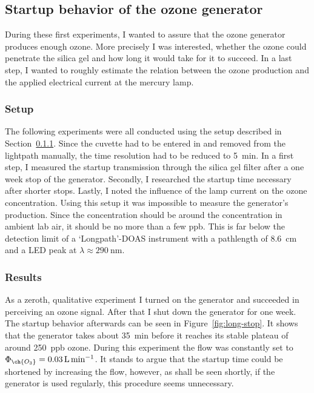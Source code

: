 \subsection{Startup behavior of the ozone generator}
\label{sec:ozone}

During these first experiments, I wanted to assure that the ozone
generator produces enough ozone. More precisely I was interested,
whether the ozone could penetrate the silica gel and how long it would
take for it to succeed. In a last step, I wanted to roughly estimate
the relation between the ozone production and the applied electrical
current at the mercury lamp.

\subsubsection{Setup}
\label{sec:ozone-setup}

The following experiments were all conducted using the setup described
in Section~\ref{sec:ozone-setup}. Since the cuvette had to be entered
in and removed from the lightpath manually, the time resolution had to
be reduced to \SI{5}{\minute}. In a first step, I measured the startup
 transmission through the silica gel filter after a one week
stop of the generator. Secondly, I researched the startup time
necessary after shorter stops. Lastly, I noted the influence of the
lamp current on the ozone concentration. Using this setup it was
impossible to measure the generator's  production. Since the
concentration should be around the  concentration in ambient
lab air, it should be no more than a few \si{ppb}. This is far below
the detection limit of a `Longpath'-DOAS instrument with a pathlength
of \SI{8.6}{\centi\meter} and a LED peak at $\lambda \approx
\SI{290}{\nano\meter}$.

\subsubsection{Results}
\label{sec:ozone-results}

As a zeroth, qualitative experiment I turned on the generator
and succeeded in perceiving an ozone signal. After that I shut down the generator
for one week. The startup behavior afterwards can be seen in
Figure~\ref{fig:long-stop}. It shows that the generator takes about
\SI{35}{\minute} before it reaches its stable plateau of around
\SI{250}{ppb} ozone. During this experiment the flow was constantly
set to $\Phi_{\ch{O_3}} = \SI{0.03}{\liter\per\minute}$. It stands to
argue that the startup time could be shortened by increasing the flow,
however, as shall be seen shortly, if the
generator is used regularly, this procedure seems unnecessary.

